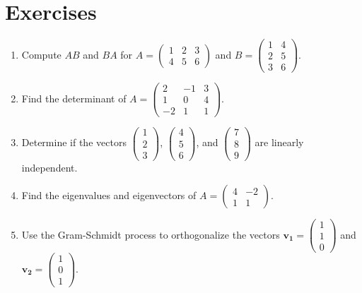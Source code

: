 \section{Exercises}

\begin{enumerate}
    \item Compute $AB$ and $BA$ for $A = \begin{pmatrix} 1 & 2 & 3 \\ 4 & 5 & 6 \end{pmatrix}$ and $B = \begin{pmatrix} 1 & 4 \\ 2 & 5 \\ 3 & 6 \end{pmatrix}$.
    
    \item Find the determinant of $A = \begin{pmatrix} 2 & -1 & 3 \\ 1 & 0 & 4 \\ -2 & 1 & 1 \end{pmatrix}$.
    
    \item Determine if the vectors $\begin{pmatrix} 1 \\ 2 \\ 3 \end{pmatrix}$, $\begin{pmatrix} 4 \\ 5 \\ 6 \end{pmatrix}$, and $\begin{pmatrix} 7 \\ 8 \\ 9 \end{pmatrix}$ are linearly independent.
    
    \item Find the eigenvalues and eigenvectors of $A = \begin{pmatrix} 4 & -2 \\ 1 & 1 \end{pmatrix}$.
    
    \item Use the Gram-Schmidt process to orthogonalize the vectors $\mathbf{v_1} = \begin{pmatrix} 1 \\ 1 \\ 0 \end{pmatrix}$ and $\mathbf{v_2} = \begin{pmatrix} 1 \\ 0 \\ 1 \end{pmatrix}$.
\end{enumerate}
